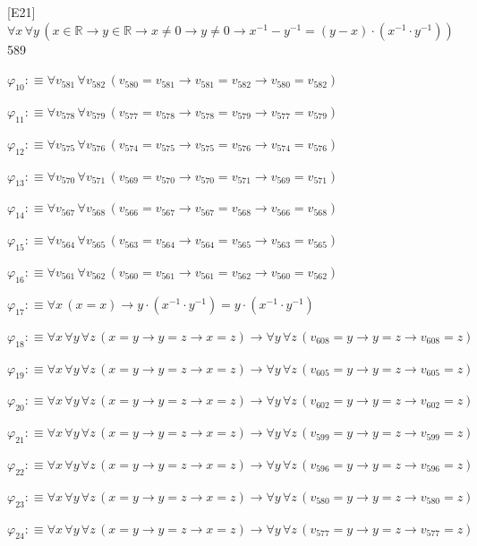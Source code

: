 \begin{fullproof}{[E21]}{$\forall x\,\forall y\,(x \in \mathbb{R} \to y \in \mathbb{R} \to x \neq 0 \to y \neq 0 \to x^{-1} - y^{-1} = (y - x) \cdot (x^{-1} \cdot y^{-1}))$}{589}
\begin{abbrevlist}
\item $\varphi_{10} :\equiv \forall v_{581}\,\forall v_{582}\,(v_{580} = v_{581} \to v_{581} = v_{582} \to v_{580} = v_{582})$
\item $\varphi_{11} :\equiv \forall v_{578}\,\forall v_{579}\,(v_{577} = v_{578} \to v_{578} = v_{579} \to v_{577} = v_{579})$
\item $\varphi_{12} :\equiv \forall v_{575}\,\forall v_{576}\,(v_{574} = v_{575} \to v_{575} = v_{576} \to v_{574} = v_{576})$
\item $\varphi_{13} :\equiv \forall v_{570}\,\forall v_{571}\,(v_{569} = v_{570} \to v_{570} = v_{571} \to v_{569} = v_{571})$
\item $\varphi_{14} :\equiv \forall v_{567}\,\forall v_{568}\,(v_{566} = v_{567} \to v_{567} = v_{568} \to v_{566} = v_{568})$
\item $\varphi_{15} :\equiv \forall v_{564}\,\forall v_{565}\,(v_{563} = v_{564} \to v_{564} = v_{565} \to v_{563} = v_{565})$
\item $\varphi_{16} :\equiv \forall v_{561}\,\forall v_{562}\,(v_{560} = v_{561} \to v_{561} = v_{562} \to v_{560} = v_{562})$
\item $\varphi_{17} :\equiv \forall x\,(x = x) \to y \cdot (x^{-1} \cdot y^{-1}) = y \cdot (x^{-1} \cdot y^{-1})$
\item $\varphi_{18} :\equiv \forall x\,\forall y\,\forall z\,(x = y \to y = z \to x = z) \to \forall y\,\forall z\,(v_{608} = y \to y = z \to v_{608} = z)$
\item $\varphi_{19} :\equiv \forall x\,\forall y\,\forall z\,(x = y \to y = z \to x = z) \to \forall y\,\forall z\,(v_{605} = y \to y = z \to v_{605} = z)$
\item $\varphi_{20} :\equiv \forall x\,\forall y\,\forall z\,(x = y \to y = z \to x = z) \to \forall y\,\forall z\,(v_{602} = y \to y = z \to v_{602} = z)$
\item $\varphi_{21} :\equiv \forall x\,\forall y\,\forall z\,(x = y \to y = z \to x = z) \to \forall y\,\forall z\,(v_{599} = y \to y = z \to v_{599} = z)$
\item $\varphi_{22} :\equiv \forall x\,\forall y\,\forall z\,(x = y \to y = z \to x = z) \to \forall y\,\forall z\,(v_{596} = y \to y = z \to v_{596} = z)$
\item $\varphi_{23} :\equiv \forall x\,\forall y\,\forall z\,(x = y \to y = z \to x = z) \to \forall y\,\forall z\,(v_{580} = y \to y = z \to v_{580} = z)$
\item $\varphi_{24} :\equiv \forall x\,\forall y\,\forall z\,(x = y \to y = z \to x = z) \to \forall y\,\forall z\,(v_{577} = y \to y = z \to v_{577} = z)$

\end{abbrevlist}
\end{fullproof}
